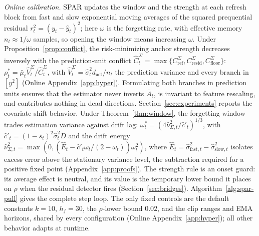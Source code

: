 \documentclass[twoside,11pt]{article}
\begin{document}
\emph{Online calibration.}
SPAR updates the window and the strength at each refresh block from fast and slow exponential moving averages of the squared prequential residual $r_t^2 = (y_t - \hat y_t)^2$; here $\omega$ is the forgetting rate, with effective memory $n_t \approx 1/\omega$ samples, so opening the window means increasing $\omega$.
Under Proposition~\ref{prop:conflict}, the risk-minimizing anchor strength decreases inversely with the prediction-unit conflict $\widehat C^\Sigma_t = \max\{C^\Sigma_{\mathrm{ref}}, C^\Sigma_{\mathrm{resid}}, C^\Sigma_{\mathrm{floor}}\}$: $\rho^*_t = \bar\mu_t \widehat V^\Sigma_t/\widehat C^\Sigma_t$, with $\widehat V^\Sigma_t = \hat\sigma^2_t d_{\mathrm{act}}/n_t$ the prediction variance and every branch in $[y^2]$ (Online Appendix~\ref{app:hyper}).
Formulating both branches in prediction units ensures that the estimator never inverts $\bar A_t$, is invariant to feature rescaling, and contributes nothing in dead directions. Section~\ref{sec:experiments} reports the covariate-shift behavior.
Under Theorem~\ref{thm:window}, the forgetting window trades estimation variance against drift lag: $\omega^*_t = (4\widehat\nu^2_{\Sigma,t} / \hat c'_t)^{1/3}$, with $\hat c'_t = (1-\bar s_t)^2 \hat\sigma^2_t D$ and the drift energy $\widehat\nu^2_{\Sigma,t} = \max(0, (\widehat E_t - \hat c'_t \omega_t/(2-\omega_t))\omega_t^2)$, where $\widehat E_t = \hat\sigma^2_{\mathrm{fast},t} - \hat\sigma^2_{\mathrm{slow},t}$ isolates excess error above the stationary variance level, the subtraction required for a positive fixed point (Appendix~\ref{app:proofs}).
The strength rule is an onset guard: its average effect is neutral, and its value is the temporary lower bound it places on $\rho$ when the residual detector fires (Section~\ref{sec:bridges}).
Algorithm~\ref{alg:spar-pull} gives the complete step loop. The only fixed controls are the default constants $k{=}10$, $h_f{=}30$, the $\rho$-lower bound $0.02$, and the clip ranges and EMA horizons, shared by every configuration (Online Appendix~\ref{app:hyper}); all other behavior adapts at runtime.
\end{document}

